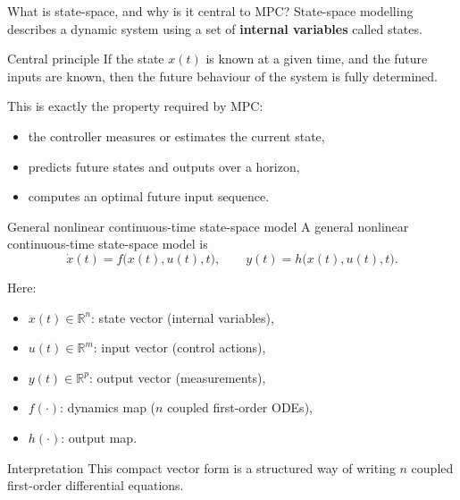 \documentclass[aspectratio=169,10pt]{beamer}
\newcommand{\R}{\mathbb{R}}
\begin{document}
\begin{frame}{What is state-space, and why is it central to MPC?}
State-space modelling describes a dynamic system using a set of
\textbf{internal variables} called states.

\begin{defnbox}{Central principle}
If the state $x(t)$ is known at a given time, and the future inputs are
known, then the future behaviour of the system is fully determined.
\end{defnbox}

This is exactly the property required by MPC:
\begin{itemize}
  \item the controller measures or estimates the current state,
  \item predicts future states and outputs over a horizon,
  \item computes an optimal future input sequence.
\end{itemize}
\end{frame}

\begin{frame}{General nonlinear continuous-time state-space model}
A general nonlinear continuous-time state-space model is
\[
\dot{x}(t)=f\!\big(x(t),u(t),t\big),
\qquad
y(t)=h\!\big(x(t),u(t),t\big).
\]

Here:
\begin{itemize}
  \item $x(t)\in\R^n$: state vector (internal variables),
  \item $u(t)\in\R^m$: input vector (control actions),
  \item $y(t)\in\R^p$: output vector (measurements),
  \item $f(\cdot)$: dynamics map ($n$ coupled first-order ODEs),
  \item $h(\cdot)$: output map.
\end{itemize}

\begin{notebox}{Interpretation}
This compact vector form is a structured way of writing $n$ coupled
first-order differential equations.
\end{notebox}
\end{frame}
\end{document}

